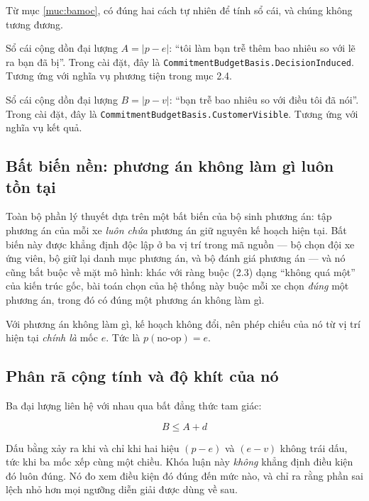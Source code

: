 Từ mục \ref{muc:bamoc}, có đúng hai cách tự nhiên để tính sổ cái, và chúng không tương đương.

\begin{dinhnghia}[Cơ sở hành vi]
Sổ cái cộng dồn đại lượng $A = |p-e|$: ``tôi làm bạn trễ thêm bao nhiêu so với lẽ ra bạn đã bị''.
Trong cài đặt, đây là \texttt{CommitmentBudgetBasis.DecisionInduced}. Tương ứng với nghĩa vụ
phương tiện trong mục 2.4.
\end{dinhnghia}

\begin{dinhnghia}
Sổ cái cộng dồn đại lượng $B = |p-v|$: ``bạn trễ bao nhiêu so với điều tôi đã nói''. Trong cài
đặt, đây là \texttt{CommitmentBudgetBasis.CustomerVisible}. Tương ứng với nghĩa vụ kết quả.
\end{dinhnghia}

\subsection{Bất biến nền: phương án không làm gì luôn tồn tại}

Toàn bộ phần lý thuyết dựa trên một bất biến của bộ sinh phương án: tập phương án của mỗi xe
\emph{luôn chứa} phương án giữ nguyên kế hoạch hiện tại. Bất biến này được khẳng định độc lập ở
ba vị trí trong mã nguồn --- bộ chọn đội xe ứng viên, bộ giữ lại danh mục phương án, và bộ đánh
giá phương án --- và nó cũng bắt buộc về mặt mô hình: khác với ràng buộc (2.3) dạng ``không quá
một'' của kiến trúc gốc, bài toán chọn của hệ thống này buộc mỗi xe chọn \emph{đúng} một phương
án, trong đó có đúng một phương án không làm gì.

Với phương án không làm gì, kế hoạch không đổi, nên phép chiếu của nó từ vị trí hiện tại
\emph{chính là} mốc $e$. Tức là $p(\text{no-op}) = e$.

\subsection{Phân rã cộng tính và độ khít của nó}
\label{muc:phanra}

Ba đại lượng liên hệ với nhau qua bất đẳng thức tam giác:

\begin{equation}
\boxed{\,B \le A + d\,}
\label{eq:phanra}
\end{equation}

Dấu bằng xảy ra khi và chỉ khi hai hiệu $(p-e)$ và $(e-v)$ không trái dấu, tức khi ba mốc xếp
cùng một chiều. Khóa luận này \emph{không} khẳng định điều kiện đó luôn đúng. Nó đo xem điều kiện
đó đúng đến mức nào, và chỉ ra rằng phần sai lệch nhỏ hơn mọi ngưỡng diễn giải được dùng về sau.


